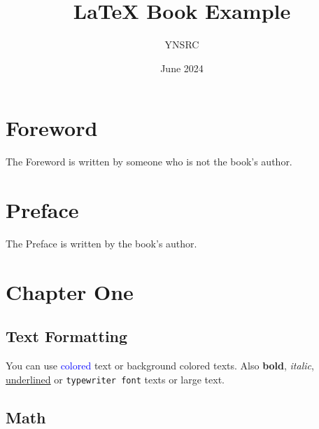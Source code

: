 \documentclass[12pt, a4paper]{book}
\title{\LaTeX{} Book Example}
\author{YNSRC}
\date{June 2024}
\begin{document}
\maketitle

\frontmatter

\large

\chapter*{Foreword}
The Foreword is written by someone who is not the book's author. \blindtext[2]

\chapter*{Preface}

The Preface is written by the book's author. \blindtext[2]

\normalsize

\tableofcontents

\listoffigures
{}

\listoftables
{}

\mainmatter

\chapter{Chapter One}

\section{Text Formatting}

You can use \textcolor{blue}{colored} text or
\colorbox{BurntOrange}{background colored} texts. Also
\textbf{bold}, \textit{italic}, \underline{underlined} or
\texttt{typewriter font} texts or \large{large} text.

\normalsize

\section{Math}
\end{document}

